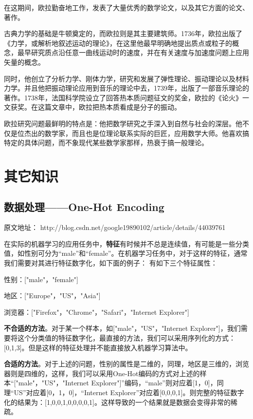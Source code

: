 \documentclass[UTF8]{ctexbook}
\begin{document}
在这期间，欧拉勤奋地工作，发表了大量优秀的数学论文，以及其它方面的论文、著作。

古典力学的基础是牛顿奠定的，而欧拉则是其主要建筑师。1736年，欧拉出版了《力学，或解析地叙述运动的理论》，在这里他最早明确地提出质点或粒子的概念，最早研究质点沿任意一曲线运动时的速度，并在有关速度与加速度问题上应用矢量的概念。

同时，他创立了分析力学、刚体力学，研究和发展了弹性理论、振动理论以及材料力学。并且他把振动理论应用到音乐的理论中去，1739年，出版了一部音乐理论的著作。1738年，法国科学院设立了回答热本质问题征文的奖金，欧拉的《论火》一文获奖。在这篇文章中，欧拉把热本质看成是分子的振动。

欧拉研究问题最鲜明的特点是：他把数学研究之手深入到自然与社会的深层。他不仅是位杰出的数学家，而且也是位理论联系实际的巨匠，应用数学大师。他喜欢搞特定的具体问题，而不象现代某些数学家那样，热衰于搞一般理论。

\chapter{其它知识}

\section{数据处理——One-Hot Encoding}

原文地址： http://blog.csdn.net/google19890102/article/details/44039761

在实际的机器学习的应用任务中，\textbf{特征}有时候并不总是连续值，有可能是一些分类值，如性别可分为“male”和“female”。在机器学习任务中，对于这样的特征，通常我们需要对其进行特征数字化，如下面的例子：
有如下三个特征属性：

性别：["male"，"female"]

地区：["Europe"，"US"，"Asia"]

浏览器：["Firefox"，"Chrome"，"Safari"，"Internet Explorer"]

\textbf{不合适的方法}。对于某一个样本，如["male"，"US"，"Internet Explorer"]，我们需要将这个分类值的特征数字化，最直接的方法，我们可以采用序列化的方式：[0,1,3]。但是这样的特征处理并不能直接放入机器学习算法中。

\textbf{合适的方法}。对于上述的问题，性别的属性是二维的，同理，地区是三维的，浏览器则是四维的，这样，我们可以采用One-Hot编码的方式对上述的样本“["male"，"US"，"Internet Explorer"]”编码，“male”则对应着[1，0]，同理“US”对应着[0，1，0]，“Internet Explorer”对应着[0,0,0,1]。则完整的特征数字化的结果为：[1,0,0,1,0,0,0,0,1]。这样导致的一个结果就是数据会变得非常的稀疏。
\end{document}
